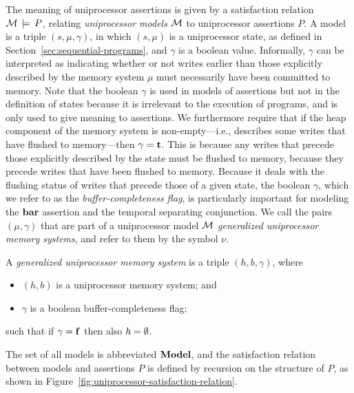 \documentclass[11pt]{report}
\begin{document}
The meaning of uniprocessor assertions is given by a satisfaction relation $\mathcal{M} \,\models\, P$, relating \emph{uniprocessor models} $\mathcal{M}$ to uniprocessor assertions $P$. A model is a triple $(s,\mu,\gamma)$, in which $(s,\mu)$ is a uniprocessor state, as defined in Section~\ref{sec:sequential-programs}, and $\gamma$ is a boolean value. Informally, $\gamma$ can be interpreted as indicating whether or not writes earlier than those explicitly described by the memory system $\mu$ must necessarily have been committed to memory. Note that the boolean $\gamma$ is used in models of assertions but not in the definition of states because it is irrelevant to the execution of programs, and is only used to give meaning to assertions. We furthermore require that if the heap component of the memory system is non-empty---i.e., describes some writes that have flushed to memory---then $\gamma = \mathbf{t}$. This is because any writes that precede those explicitly described by the state must be flushed to memory, because they precede writes that have been flushed to memory. Because it deals with the flushing status of writes that precede those of a given state, the boolean $\gamma$, which we refer to as the \emph{buffer-completeness flag}, is particularly important for modeling the $\mathbf{bar}$ assertion and the temporal separating conjunction. We call the pairs $(\mu,\gamma)$ that are part of a uniprocessor model $\mathcal{M}$ \emph{generalized uniprocessor memory systems}, and refer to them by the symbol $\nu$.

\begin{definition}
  A \emph{generalized uniprocessor memory system} is a triple $(h, b, \gamma)$, where \begin{itemize}
    \item $(h,b)$ is a uniprocessor memory system; and
    \item $\gamma$ is a boolean buffer-completeness flag; 
  \end{itemize} such that if $\gamma = \mathbf{f}$ then also $h = \operatorname{\emptyset}$. 
\end{definition} 

The set of all models is abbreviated $\mathbf{Model}$, and the satisfaction relation between models and assertions $P$ is defined by recursion on the structure of $P$, as shown in Figure~\ref{fig:uniprocessor-satisfaction-relation}. 
\end{document}
